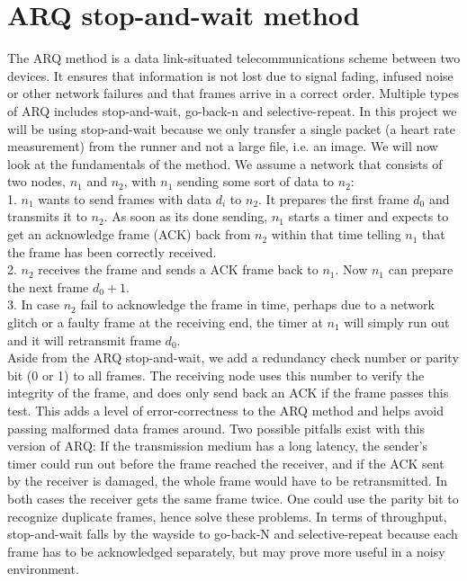 \section{ARQ stop-and-wait method}\label{th:arq}

The ARQ method is a data link-situated telecommunications scheme between two devices. It ensures that information is not lost due to signal fading, infused noise or other network failures and that frames arrive in a correct order. Multiple types of ARQ includes stop-and-wait, go-back-n and selective-repeat. In this project we will be using stop-and-wait because we only transfer a single packet (a heart rate measurement) from the runner and not a large file, i.e. an image. We will now look at the fundamentals of the method. We assume a network that consists of two nodes, $n_1$ and $n_2$, with $n_1$ sending some sort of data to $n_2$: \newline \\
1. $n_1$ wants to send frames with data $d_i$ to $n_2$. It prepares the first frame $d_0$ and transmits it to $n_2$. As soon as its done sending, $n_1$ starts a timer and expects to get an acknowledge frame (ACK) back from $n_2$ within that time telling $n_1$ that the frame has been correctly received. \newline \\
2. $n_2$ receives the frame and sends a ACK frame back to $n_1$. Now $n_1$ can prepare the next frame $d_0+1$. \newline \\
3. In case $n_2$ fail to acknowledge the frame in time, perhaps due to a network glitch or a faulty frame at the receiving end, the timer at $n_1$ will simply run out and it will retransmit frame $d_0$. \newline \\
\noindent Aside from the ARQ stop-and-wait, we add a redundancy check number or parity bit (0 or 1) to all frames. The receiving node uses this number to verify the integrity of the frame, and does only send back an ACK if the frame passes this test. This adds a level of error-correctness to the ARQ method and helps avoid passing malformed data frames around. Two possible pitfalls exist with this version of ARQ: If the transmission medium has a long latency, the sender's timer could run out before the frame reached the receiver, and if the ACK sent by the receiver is damaged, the whole frame would have to be retransmitted. In both cases the receiver gets the same frame twice. One could use the parity bit to recognize duplicate frames, hence solve these problems. In terms of throughput, stop-and-wait falls by the wayside to go-back-N and selective-repeat because each frame has to be acknowledged separately, but may prove more useful in a noisy environment.
